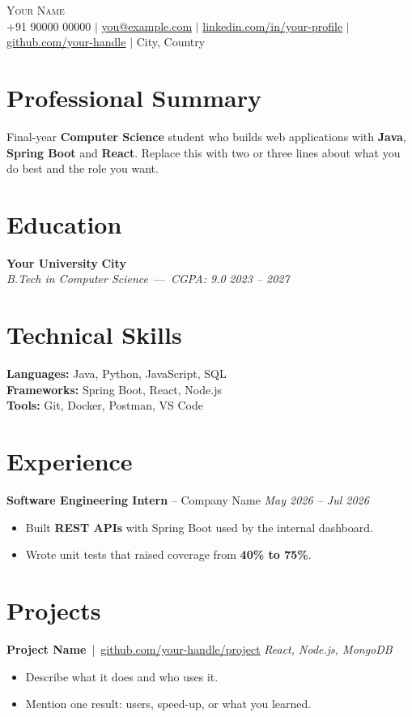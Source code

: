 \documentclass[10pt,a4paper]{article}
\begin{document}
\begin{center}
{\Huge\scshape Your Name}\\[5pt]
{\small +91 90000 00000 $|$ \href{mailto:you@example.com}{you@example.com} $|$ \href{https://linkedin.com/in/your-profile}{linkedin.com/in/your-profile} $|$ \href{https://github.com/your-handle}{github.com/your-handle} $|$ City, Country}
\end{center}

\section{Professional Summary}
Final-year \textbf{Computer Science} student who builds web applications with \textbf{Java}, \textbf{Spring Boot} and \textbf{React}. Replace this with two or three lines about what you do best and the role you want.

\section{Education}
\textbf{Your University} \hfill \textbf{City}\\
\textit{B.Tech in Computer Science} \,---\, \textit{CGPA: 9.0} \hfill \textit{2023 -- 2027}

\section{Technical Skills}
\textbf{Languages:} Java, Python, JavaScript, SQL\\
\textbf{Frameworks:} Spring Boot, React, Node.js\\
\textbf{Tools:} Git, Docker, Postman, VS Code

\section{Experience}
  \textbf{Software Engineering Intern} -- Company Name \hfill \textit{May 2026 -- Jul 2026}\\[-9pt]
  \begin{itemize}
    \item Built \textbf{REST APIs} with Spring Boot used by the internal dashboard.
    \item Wrote unit tests that raised coverage from \textbf{40\% to 75\%}.
  \end{itemize}
  \vspace{3pt}

\section{Projects}
  \textbf{Project Name} \,|\, \href{https://github.com/your-handle/project}{\underline{github.com/your-handle/project}} \hfill \textit{\small React, Node.js, MongoDB}\\[-9pt]
  \begin{itemize}
    \item Describe what it does and who uses it.
    \item Mention one result: users, speed-up, or what you learned.
  \end{itemize}
  \vspace{3pt}
\end{document}
